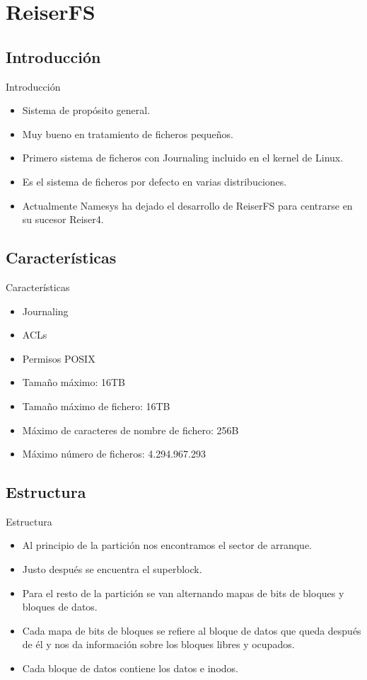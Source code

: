 \section{ReiserFS}
\subsection{Introducción}
\begin{frame}{Introducción}
  \begin{itemize}
    \item Sistema de propósito general.
    \item Muy bueno en tratamiento de ficheros pequeños.
    \item Primero sistema de ficheros con Journaling incluido en el kernel de Linux.
    \item Es el sistema de ficheros por defecto en varias distribuciones.
    \item Actualmente Namesys ha dejado el desarrollo de ReiserFS para centrarse en su sucesor Reiser4.
  \end{itemize}
\end{frame}

\subsection{Características}
\begin{frame}{Características}
  \begin{itemize}
    \item Journaling
    \item ACLs
    \item Permisos POSIX
    \item Tamaño máximo: 16TB
    \item Tamaño máximo de fichero: 16TB
    \item Máximo de caracteres de nombre de fichero: 256B
    \item Máximo número de ficheros: 4.294.967.293
  \end{itemize}
\end{frame}

\subsection{Estructura}
\begin{frame}{Estructura}
  \begin{itemize}
    \item Al principio de la partición nos encontramos el sector de arranque.
    \item Justo después se encuentra el superblock.
    \item Para el resto de la partición se van alternando mapas de bits de bloques y bloques de datos.
    \item Cada mapa de bits de bloques se refiere al bloque de datos que queda después de él y nos da información sobre los bloques libres  y ocupados.
    \item Cada bloque de datos contiene los datos e inodos.
  \end{itemize}
\end{frame}

